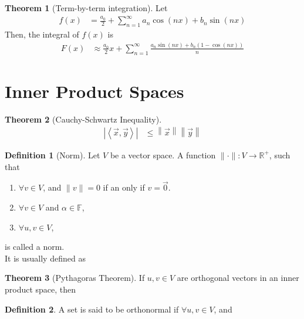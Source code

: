 \documentclass[fleqn, 8pt]{amsart}
\theoremstyle{definition}
\newtheorem{definition}{Definition}
\theoremstyle{theorem}
\newtheorem{theorem}{Theorem}
\begin{document}
\begin{multicols}{2}
\begin{spacing}{0.7}
\begin{theorem}[Term-by-term integration]
	Let
	\begin{align*}
		f(x) &= \frac{a_0}{2} + \sum\limits_{n = 1}^{\infty} a_n \cos(n x) + b_n \sin(n x)
	\end{align*}
	Then, the integral of $f(x)$ is
	\begin{align*}
		F(x) &\approx \frac{a_0}{2} x + \sum\limits_{n = 1}^{\infty} \frac{a_n \sin(n x) + b_n\left( 1 - \cos(n x) \right)}{n}
	\end{align*}
\end{theorem}

\section{Inner Product Spaces}

\begin{theorem}[Cauchy-Schwartz Inequality]
	\begin{align*}
		\left| \left\langle \overrightarrow{x},\overrightarrow{y} \right\rangle \right| &\le \left\| \overrightarrow{x} \right\| \left\| \overrightarrow{y} \right\|
	\end{align*}
	\label{thm:Cauchy-Schwartz_Inequality}
\end{theorem}

\begin{definition}[Norm]
	Let $V$ be a vector space.
	A function $\|\cdot\| : V \to \mathbb{R}^+$, such that
	\begin{enumerate}
		\item
			$\forall v \in V$,
			and $\|v\| = 0$ if an only if $v = \overrightarrow{0}$.
		\item
			$\forall v \in V$ and $\alpha \in \mathbb{F}$,
		\item
			$\forall u,v \in V$,
	\end{enumerate}
	is called a norm.\\
	It is usually defined as
\end{definition}

\begin{theorem}[Pythagoras Theorem]
	If $u,v \in V$ are orthogonal vectors in an inner product space, then
	\label{thm:Pythagoras_Theorem}
\end{theorem}

\begin{definition}
	A set is said to be orthonormal if $\forall u,v \in V$,
	and
\end{definition}


\end{spacing}
\end{multicols}
\end{document}
